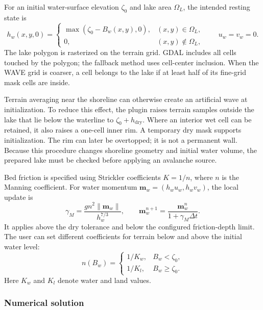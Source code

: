 \documentclass[11pt,a4paper]{article}
\begin{document}
For an initial water-surface elevation $\zeta_0$ and lake area $\Omega_L$,
the intended resting state is
\begin{equation}
  h_w(x,y,0)=
  \begin{cases}
    \max(\zeta_0-B_w(x,y),0), & (x,y)\in\Omega_L,\\
    0, & (x,y)\notin\Omega_L,
  \end{cases}
  \qquad u_w=v_w=0.
  \label{eq:wave-initial-lake}
\end{equation}
The lake polygon is rasterized on the terrain grid. GDAL includes all cells
touched by the polygon; the fallback method uses cell-center inclusion.
When the WAVE grid is coarser, a cell belongs to the lake if at least half
of its fine-grid mask cells are inside.

Terrain averaging near the shoreline can otherwise create an artificial
wave at initialization. To reduce this effect, the plugin raises terrain
samples outside the lake that lie below the waterline to
$\zeta_0+h_{\mathrm{dry}}$. Where an interior wet cell can be retained, it
also raises a one-cell inner rim. A temporary dry mask supports initialization.
The rim can later be overtopped; it is not a permanent wall. Because this
procedure changes shoreline geometry and initial water volume, the prepared
lake must be checked before applying an avalanche source.

Bed friction is specified using Strickler coefficients $K=1/n$, where $n$
is the Manning coefficient. For water momentum
$\boldsymbol{m}_w=(h_wu_w,h_wv_w)$, the local update is
\begin{equation}
  \gamma_M=\frac{g n^2\lVert\boldsymbol{m}_w\rVert}{h_w^{7/3}},
  \qquad
  \boldsymbol{m}_w^{n+1}
  =\frac{\boldsymbol{m}_w^n}{1+\gamma_M\Delta t}.
  \label{eq:wave-manning}
\end{equation}
It applies above the dry tolerance and below the configured friction-depth
limit. The user can set different coefficients for terrain below and above
the initial water level:
\begin{equation}
  n(B_w)=
  \begin{cases}
    1/K_w, & B_w<\zeta_0,\\
    1/K_l, & B_w\geq\zeta_0.
  \end{cases}
  \label{eq:wave-strickler-zones}
\end{equation}
Here $K_w$ and $K_l$ denote water and land values.

\subsubsection{Numerical solution}
\end{document}
